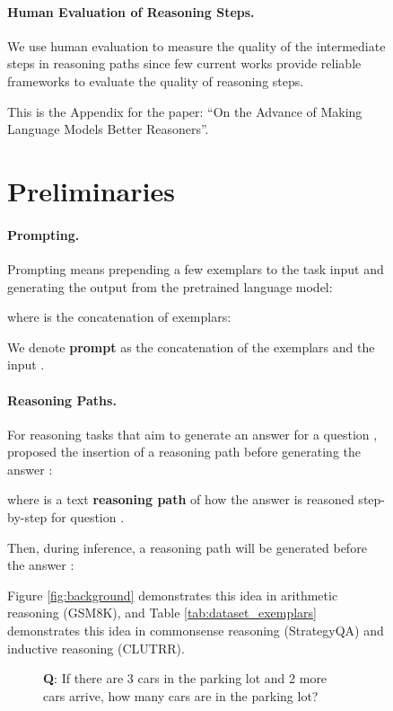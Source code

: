 \documentclass[11pt,a4paper]{article}
\begin{document}
\begin{figure}[t]
\begin{tcolorbox}[colback=blue!5!white,colframe=blue!75!black,title=Chain-Of-Thought Reasoning for GSM8K Math Word Problem,fontupper=\footnotesize,fonttitle=\scriptsize]
\paragraph{Human Evaluation of Reasoning Steps.} We use human evaluation to measure the quality of the intermediate steps in reasoning paths since few current works provide reliable frameworks to evaluate the quality of reasoning steps.




\clearpage


\appendix
This is the Appendix for the paper: ``On the Advance of Making Language Models Better Reasoners''.



\section{Preliminaries}

\paragraph{Prompting.}

Prompting means prepending a few exemplars to the task input  and
generating the output  from the pretrained language model:

where  is the concatenation of  exemplars:

We denote \textbf{prompt} as the concatenation of the exemplars  and the input .

\paragraph{Reasoning Paths.}

For reasoning tasks that aim to generate an answer  for a question , \citet{wei2022chain} proposed the insertion of a reasoning path  before generating the answer :

where  is a text \textbf{reasoning path} of how the answer  is reasoned step-by-step for question .

Then, during inference, a reasoning path  will be generated before the answer :


Figure \ref{fig:background} demonstrates this idea in arithmetic reasoning (GSM8K), and Table \ref{tab:dataset_exemplars} demonstrates this idea in commonsense reasoning (StrategyQA) and inductive reasoning (CLUTRR).

\begin{figure}[t]
\begin{tcolorbox}[colback=blue!5!white,colframe=blue!75!black,title=Prompt \& Samples,fontupper=\footnotesize,fonttitle=\scriptsize]
\textbf{Q}: If there are 3 cars in the parking lot and 2 more cars arrive, how many cars are in the parking lot?


\end{tcolorbox}
\end{figure}
\end{tcolorbox}
\end{figure}
\end{document}
